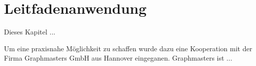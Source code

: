 \chapter{Leitfadenanwendung}
\label{sec:model_evaluation}

Dieses Kapitel ...

Um eine praxisnahe Möglichkeit zu schaffen wurde dazu eine Kooperation mit der Firma Graphmasters GmbH aus Hannover eingeganen. Graphmasters ist ...



